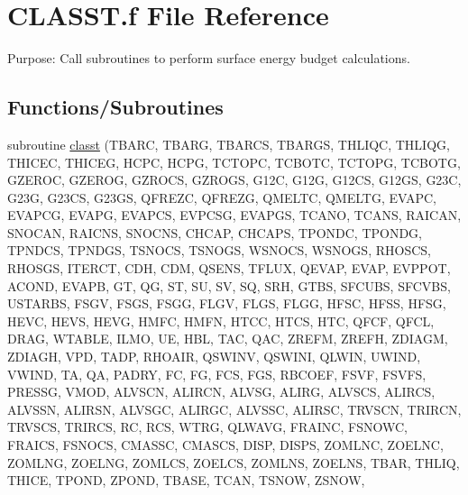 \hypertarget{CLASST_8f}{}\section{C\+L\+A\+S\+S\+T.\+f File Reference}
\label{CLASST_8f}


Purpose\+: Call subroutines to perform surface energy budget calculations.  


\subsection*{Functions/\+Subroutines}
\begin{DoxyCompactItemize}
\item 
subroutine \hyperlink{CLASST_8f_a676b19c50cb1465a40c967d75168a72f}{classt} (T\+B\+A\+R\+C, T\+B\+A\+R\+G, T\+B\+A\+R\+C\+S, T\+B\+A\+R\+G\+S, T\+H\+L\+I\+Q\+C, T\+H\+L\+I\+Q\+G, T\+H\+I\+C\+E\+C, T\+H\+I\+C\+E\+G, H\+C\+P\+C, H\+C\+P\+G, T\+C\+T\+O\+P\+C, T\+C\+B\+O\+T\+C, T\+C\+T\+O\+P\+G, T\+C\+B\+O\+T\+G, G\+Z\+E\+R\+O\+C, G\+Z\+E\+R\+O\+G, G\+Z\+R\+O\+C\+S, G\+Z\+R\+O\+G\+S, G12\+C, G12\+G, G12\+C\+S, G12\+G\+S, G23\+C, G23\+G, G23\+C\+S, G23\+G\+S, Q\+F\+R\+E\+Z\+C, Q\+F\+R\+E\+Z\+G, Q\+M\+E\+L\+T\+C, Q\+M\+E\+L\+T\+G, E\+V\+A\+P\+C, E\+V\+A\+P\+C\+G, E\+V\+A\+P\+G, E\+V\+A\+P\+C\+S, E\+V\+P\+C\+S\+G, E\+V\+A\+P\+G\+S, T\+C\+A\+N\+O, T\+C\+A\+N\+S, R\+A\+I\+C\+A\+N, S\+N\+O\+C\+A\+N, R\+A\+I\+C\+N\+S, S\+N\+O\+C\+N\+S, C\+H\+C\+A\+P, C\+H\+C\+A\+P\+S, T\+P\+O\+N\+D\+C, T\+P\+O\+N\+D\+G, T\+P\+N\+D\+C\+S, T\+P\+N\+D\+G\+S, T\+S\+N\+O\+C\+S, T\+S\+N\+O\+G\+S, W\+S\+N\+O\+C\+S, W\+S\+N\+O\+G\+S, R\+H\+O\+S\+C\+S, R\+H\+O\+S\+G\+S, I\+T\+E\+R\+C\+T, C\+D\+H, C\+D\+M, Q\+S\+E\+N\+S, T\+F\+L\+U\+X, Q\+E\+V\+A\+P, E\+V\+A\+P, E\+V\+P\+P\+O\+T, A\+C\+O\+N\+D, E\+V\+A\+P\+B, G\+T, Q\+G, S\+T, S\+U, S\+V, S\+Q, S\+R\+H, G\+T\+B\+S, S\+F\+C\+U\+B\+S, S\+F\+C\+V\+B\+S, U\+S\+T\+A\+R\+B\+S, F\+S\+G\+V, F\+S\+G\+S, F\+S\+G\+G, F\+L\+G\+V, F\+L\+G\+S, F\+L\+G\+G, H\+F\+S\+C, H\+F\+S\+S, H\+F\+S\+G, H\+E\+V\+C, H\+E\+V\+S, H\+E\+V\+G, H\+M\+F\+C, H\+M\+F\+N, H\+T\+C\+C, H\+T\+C\+S, H\+T\+C, Q\+F\+C\+F, Q\+F\+C\+L, D\+R\+A\+G, W\+T\+A\+B\+L\+E, I\+L\+M\+O, U\+E, H\+B\+L, T\+A\+C, Q\+A\+C, Z\+R\+E\+F\+M, Z\+R\+E\+F\+H, Z\+D\+I\+A\+G\+M, Z\+D\+I\+A\+G\+H, V\+P\+D, T\+A\+D\+P, R\+H\+O\+A\+I\+R, Q\+S\+W\+I\+N\+V, Q\+S\+W\+I\+N\+I, Q\+L\+W\+I\+N, U\+W\+I\+N\+D, V\+W\+I\+N\+D, T\+A, Q\+A, P\+A\+D\+R\+Y, F\+C, F\+G, F\+C\+S, F\+G\+S, R\+B\+C\+O\+E\+F, F\+S\+V\+F, F\+S\+V\+F\+S, P\+R\+E\+S\+S\+G, V\+M\+O\+D, A\+L\+V\+S\+C\+N, A\+L\+I\+R\+C\+N, A\+L\+V\+S\+G, A\+L\+I\+R\+G, A\+L\+V\+S\+C\+S, A\+L\+I\+R\+C\+S, A\+L\+V\+S\+S\+N, A\+L\+I\+R\+S\+N, A\+L\+V\+S\+G\+C, A\+L\+I\+R\+G\+C, A\+L\+V\+S\+S\+C, A\+L\+I\+R\+S\+C, T\+R\+V\+S\+C\+N, T\+R\+I\+R\+C\+N, T\+R\+V\+S\+C\+S, T\+R\+I\+R\+C\+S, R\+C, R\+C\+S, W\+T\+R\+G, Q\+L\+W\+A\+V\+G, F\+R\+A\+I\+N\+C, F\+S\+N\+O\+W\+C, F\+R\+A\+I\+C\+S, F\+S\+N\+O\+C\+S, C\+M\+A\+S\+S\+C, C\+M\+A\+S\+C\+S, D\+I\+S\+P, D\+I\+S\+P\+S, Z\+O\+M\+L\+N\+C, Z\+O\+E\+L\+N\+C, Z\+O\+M\+L\+N\+G, Z\+O\+E\+L\+N\+G, Z\+O\+M\+L\+C\+S, Z\+O\+E\+L\+C\+S, Z\+O\+M\+L\+N\+S, Z\+O\+E\+L\+N\+S, T\+B\+A\+R, T\+H\+L\+I\+Q, T\+H\+I\+C\+E, T\+P\+O\+N\+D, Z\+P\+O\+N\+D, T\+B\+A\+S\+E, T\+C\+A\+N, T\+S\+N\+O\+W, Z\+S\+N\+O\+W, 
\end{DoxyCompactItemize}
